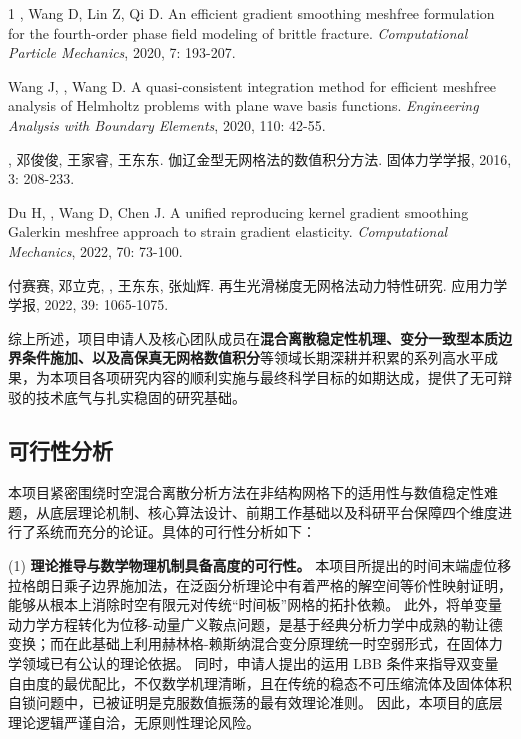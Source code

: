 \begin{thebibliography}{1}
	, Wang D, Lin Z, Qi D.
	\newblock An efficient gradient smoothing meshfree formulation for the
	  fourth-order phase field modeling of brittle fracture.
	\newblock \emph{Computational Particle Mechanics}, 2020, 7: 193-207.

	Wang J, , Wang D.
	\newblock A quasi-consistent integration method for efficient meshfree analysis
	  of {{Helmholtz}} problems with plane wave basis functions.
	\newblock \emph{Engineering Analysis with Boundary Elements}, 2020, 110: 42-55.

	\textbf{}, 邓俊俊, 王家睿, 王东东.
	\newblock 伽辽金型无网格法的数值积分方法.
	\newblock 固体力学学报, 2016, 3: 208-233.

	Du H, , Wang D, Chen J.
	\newblock A unified reproducing kernel gradient smoothing {{Galerkin}} meshfree
	  approach to strain gradient elasticity.
	\newblock \emph{Computational Mechanics}, 2022, 70: 73-100.

	付赛赛, 邓立克, \textbf{}, 王东东, 张灿辉.
	\newblock 再生光滑梯度无网格法动力特性研究.
	\newblock 应用力学学报, 2022, 39: 1065-1075.

\end{thebibliography}

综上所述，项目申请人及核心团队成员在\textbf{混合离散稳定性机理、变分一致型本质边界条件施加、以及高保真无网格数值积分}等领域长期深耕并积累的系列高水平成果，为本项目各项研究内容的顺利实施与最终科学目标的如期达成，提供了无可辩驳的技术底气与扎实稳固的研究基础。

\subsection{\bfseries 可行性分析}

本项目紧密围绕时空混合离散分析方法在非结构网格下的适用性与数值稳定性难题，从底层理论机制、核心算法设计、前期工作基础以及科研平台保障四个维度进行了系统而充分的论证。具体的可行性分析如下：

(1) \textbf{理论推导与数学物理机制具备高度的可行性。}
本项目所提出的时间末端虚位移拉格朗日乘子边界施加法，在泛函分析理论中有着严格的解空间等价性映射证明，能够从根本上消除时空有限元对传统“时间板”网格的拓扑依赖。
此外，将单变量动力学方程转化为位移-动量广义鞍点问题，是基于经典分析力学中成熟的勒让德变换；而在此基础上利用赫林格-赖斯纳混合变分原理统一时空弱形式，在固体力学领域已有公认的理论依据。
同时，申请人提出的运用 LBB 条件来指导双变量自由度的最优配比，不仅数学机理清晰，且在传统的稳态不可压缩流体及固体体积自锁问题中，已被证明是克服数值振荡的最有效理论准则。
因此，本项目的底层理论逻辑严谨自洽，无原则性理论风险。

